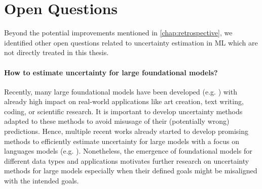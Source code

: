 


\section{Open Questions}

Beyond the potential improvements mentioned in \cref{chap:retrospective}, we identified other open questions related to uncertainty estimation in ML which are not directly treated in this thesis.

\paragraph{How to estimate uncertainty for large foundational models?} Recently, many large foundational models have been developed (e.g. \cite{gpt, rombach2021highresolution, galactica}) with already high impact on real-world applications like art creation, text writing, coding, or scientific research. It is important to develop uncertainty methods adapted to these methods to avoid misusage of their (potentially wrong) predictions. Hence, multiple recent works already started to develop promising methods to efficiently estimate uncertainty for large models with a focus on languages models (e.g. \citep{kuhn2023semantic,kadavath2022language}). Nonetheless, the emergence of foundational models for different data types and applications motivates further research on uncertainty methods for large models especially when their defined goals might be misaligned with the intended goals.

